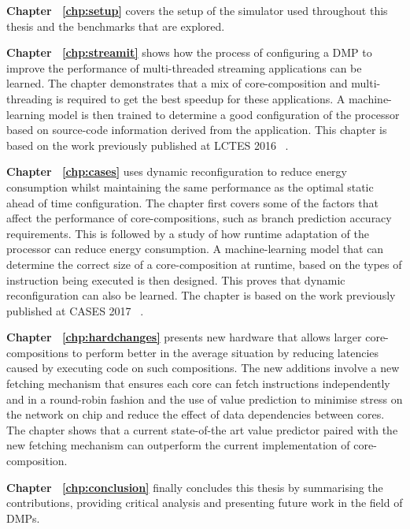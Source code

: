 \textbf{Chapter ~\ref{chp:setup}} covers the setup of the simulator used throughout this thesis and the benchmarks that are explored.

\textbf{Chapter ~\ref{chp:streamit}} shows how the process of configuring a DMP to improve the performance of multi-threaded streaming applications can be learned.
The chapter demonstrates that a mix of core-composition and multi-threading is required to get the best speedup for these applications.
A machine-learning model is then trained to determine a good configuration of the processor based on source-code information derived from the application.
This chapter is based on the work previously published at LCTES 2016 ~\cite{micolet2016dmpstream}.

\textbf{Chapter ~\ref{chp:cases}} uses dynamic reconfiguration to reduce energy consumption whilst maintaining the same performance as the optimal static ahead of time configuration.
The chapter first covers some of the factors that affect the performance of core-compo\-sitions, such as branch prediction accuracy requirements.
This is followed by a study of how runtime adaptation of the processor can reduce energy consumption.
A machine-learning model that can determine the correct size of a core-composition at runtime, based on the types of instruction being executed is then designed.
This proves that dynamic reconfiguration can also be learned.
The chapter is based on the work previously published at CASES 2017 ~\cite{micolet2017cases}.

\textbf{Chapter ~\ref{chp:hardchanges}} presents new hardware that allows larger core-compositions to perform better in the average situation by reducing latencies caused by executing code on such compositions.
The new additions involve a new fetching mechanism that ensures each core can fetch instructions independently and in a round-robin fashion and the use of value prediction to minimise stress on the network on chip and reduce the effect of data dependencies between cores.
The chapter shows that a current state-of-the art value predictor paired with the new fetching mechanism can outperform the current implementation of core-composition.

\textbf{Chapter ~\ref{chp:conclusion}} finally concludes this thesis by summarising the contributions, providing critical analysis and presenting future work in the field of DMPs.
